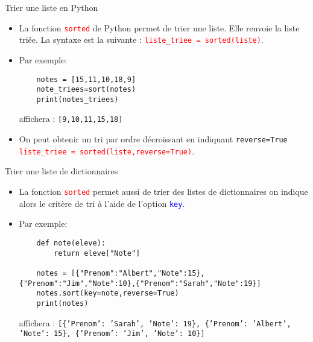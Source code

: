 \documentclass[10pt]{beamer}
\begin{document}
\begin{frame}[fragile]
	\mframe{\DB}
	\begin{alertblock}{Trier une liste en Python}
		\begin{itemize}
			\item<1-> La fonction \textcolor{red}{\tt sorted} de Python permet de trier une liste. Elle renvoie la liste triée. La syntaxe est la suivante : \textcolor{red}{\tt liste\_triee = sorted(liste)}.
			\item<2-> Par exemple:
			      \begin{lstlisting}
	notes = [15,11,10,18,9]
	note_triees=sort(notes)
	print(notes_triees)
	 \end{lstlisting}
			      affichera : {\tt [9,10,11,15,18]}
			\item<3-> On peut obtenir un tri par ordre décroissant en indiquant {\tt reverse=True} \textcolor{red}{\tt liste\_triee = sorted(liste,reverse=True)}.
		\end{itemize}
	\end{alertblock}
\end{frame}

\begin{frame}[fragile]
	\mframe{\DB}
	\begin{alertblock}{Trier une liste de dictionnaires}
		\begin{itemize}
			\item<1-> La fonction \textcolor{red}{\tt sorted} permet aussi de trier des listes de dictionnaires on indique alors le critère de tri à l'aide de l'option \textcolor{blue}{\tt key}.
			\item<2-> Par exemple:
			      \begin{lstlisting}
	def note(eleve):
		return eleve["Note"]	
	
	notes = [{"Prenom":"Albert","Note":15},{"Prenom":"Jim","Note":10},{"Prenom":"Sarah","Note":19}]
	notes.sort(key=note,reverse=True)
	print(notes)
	 \end{lstlisting}
			      affichera : {\tt [\{'Prenom': 'Sarah', 'Note': 19\}, \{'Prenom': 'Albert', 'Note': 15\}, \{'Prenom': 'Jim', 'Note': 10\}]}
		\end{itemize}
	\end{alertblock}
\end{frame}
\end{document}
